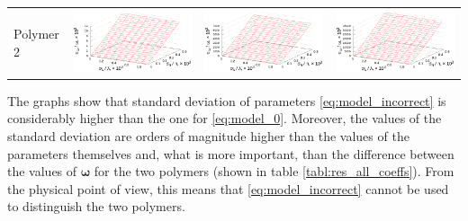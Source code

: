 \documentclass[11pt,a4paper]{article}
\theoremstyle{definition}
\begin{document}
\begin{table}[h]
\begin{tabular}{l | c c c}
	\begin{rotate}{90}Polymer 2\end{rotate} &	\includegraphics[scale=0.4]{figs/all/p2.txt_coeff0.dat.eps} & \includegraphics[scale=0.4]{figs/all/p2.txt_coeff1.dat.eps} & \includegraphics[scale=0.4]{figs/all/p2.txt_coeff2.dat.eps}
  \end{tabular}
  \label{tabl:res_incorrect}
\end{table}

The graphs show that standard deviation of parameters \eqref{eq:model_incorrect}
is considerably higher than the one for \eqref{eq:model_0}.
Moreover, the values of the standard deviation are orders of magnitude
higher than the values of the parameters themselves and, what is more
important, than the difference between the values of $\boldsymbol{\omega}$
for the two polymers
(shown in table \ref{tabl:res_all_coeffs}). From the physical point of view,
this means that \eqref{eq:model_incorrect} cannot be used
to distinguish the two polymers.
\end{document}
